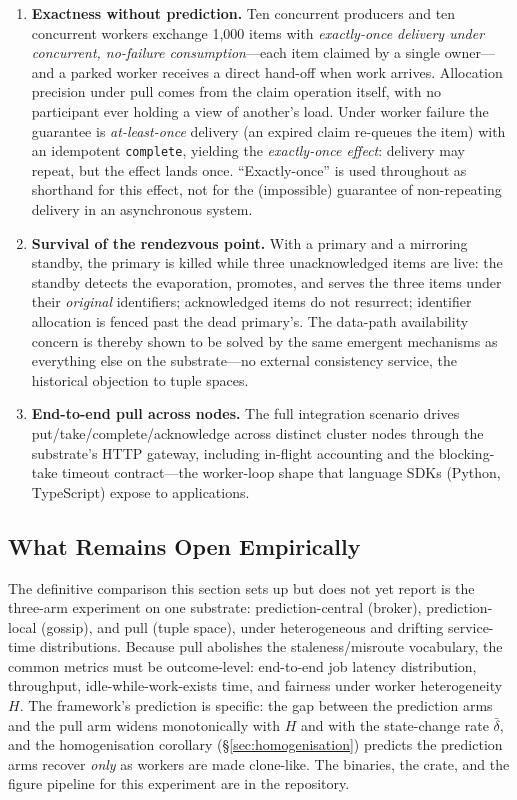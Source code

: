\documentclass[11pt]{article}
\theoremstyle{definition}
\theoremstyle{plain}
\theoremstyle{plain}
\begin{document}
\begin{enumerate}
\item \textbf{Exactness without prediction.} Ten concurrent producers and
  ten concurrent workers exchange 1{,}000 items with \emph{exactly-once delivery
  under concurrent, no-failure consumption}---each item claimed by a single
  owner---and a parked worker receives a direct hand-off when work arrives.
  Allocation precision under pull comes from the claim operation itself, with no
  participant ever holding a view of another's load. Under worker failure the
  guarantee is \emph{at-least-once} delivery (an expired claim re-queues the item)
  with an idempotent \texttt{complete}, yielding the \emph{exactly-once effect}:
  delivery may repeat, but the effect lands once. ``Exactly-once'' is used
  throughout as shorthand for this effect, not for the (impossible) guarantee of
  non-repeating delivery in an asynchronous system.
\item \textbf{Survival of the rendezvous point.} With a primary and a
  mirroring standby, the primary is killed while three unacknowledged
  items are live: the standby detects the evaporation, promotes, and
  serves the three items under their \emph{original} identifiers;
  acknowledged items do not resurrect; identifier allocation is fenced
  past the dead primary's. The data-path availability concern is thereby
  shown to be solved by the same emergent mechanisms as everything else
  on the substrate---no external consistency service, the historical
  objection to tuple spaces.
\item \textbf{End-to-end pull across nodes.} The full integration scenario
  drives put/take/complete/acknowledge across distinct cluster nodes
  through the substrate's HTTP gateway, including in-flight accounting
  and the blocking-take timeout contract---the worker-loop shape that
  language SDKs (Python, TypeScript) expose to applications.
\end{enumerate}

\subsection{What Remains Open Empirically}

The definitive comparison this section sets up but does not yet report is
the three-arm experiment on one substrate: prediction-central (broker),
prediction-local (gossip), and pull (tuple space), under heterogeneous and
drifting service-time distributions. Because pull abolishes the
staleness/misroute vocabulary, the common metrics must be outcome-level:
end-to-end job latency distribution, throughput, idle-while-work-exists
time, and fairness under worker heterogeneity $H$. The framework's
prediction is specific: the gap between the prediction arms and the pull
arm widens monotonically with $H$ and with the state-change rate
$\bar{\delta}$, and the homogenisation corollary
(\S\ref{sec:homogenisation}) predicts the prediction arms recover
\emph{only} as workers are made clone-like. The binaries, the crate, and
the figure pipeline for this experiment are in the repository.
\end{document}
